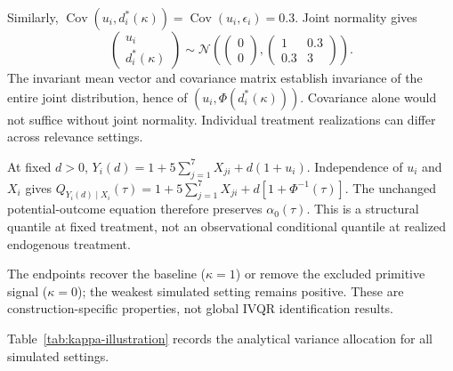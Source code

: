 Similarly, $\operatorname{Cov}(u_i,d_i^*(\kappa))=\operatorname{Cov}(u_i,\epsilon_i)=0.3$. Joint normality gives
\begin{equation}
 \begin{pmatrix}u_i\\d_i^*(\kappa)\end{pmatrix}
 \sim\mathcal{N}\!\left(
 \begin{pmatrix}0\\0\end{pmatrix},
 \begin{pmatrix}1&0.3\\0.3&3\end{pmatrix}\right).
 \label{eq:appendix-endogeneity-invariance}
\end{equation}
The invariant mean vector and covariance matrix establish invariance of the entire joint distribution, hence of $(u_i,\Phi(d_i^*(\kappa)))$. Covariance alone would not suffice without joint normality. Individual treatment realizations can differ across relevance settings.

At fixed $d>0$, $Y_i(d)=1+5\sum_{j=1}^7X_{ji}+d(1+u_i)$. Independence of $u_i$ and $X_i$ gives $Q_{Y_i(d)\mid X_i}(\tau)=1+5\sum_{j=1}^7X_{ji}+d[1+\Phi^{-1}(\tau)]$. The unchanged potential-outcome equation therefore preserves $\alpha_0(\tau)$. This is a structural quantile at fixed treatment, not an observational conditional quantile at realized endogenous treatment.

The endpoints recover the baseline ($\kappa=1$) or remove the excluded primitive signal ($\kappa=0$); the weakest simulated setting remains positive. These are construction-specific properties, not global IVQR identification results.

Table~\ref{tab:kappa-illustration} records the analytical variance allocation for all simulated settings.

\FloatBarrier
